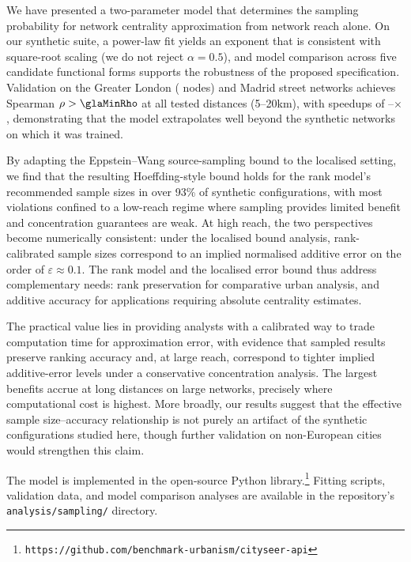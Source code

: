 
We have presented a two-parameter model that determines the sampling probability for network centrality approximation from network reach alone. On our synthetic suite, a power-law fit yields an exponent that is consistent with square-root scaling (we do not reject $\alpha = 0.5$), and model comparison across five candidate functional forms supports the robustness of the proposed specification. Validation on the Greater London (\glaNnodes{} nodes) and Madrid street networks achieves Spearman $\rho > \glaMinRho$ at all tested distances (5--20km), with speedups of \glaFiveKmSpeedup{}--\glaTwentyKmSpeedup{}$\times$, demonstrating that the model extrapolates well beyond the synthetic networks on which it was trained.

By adapting the Eppstein--Wang source-sampling bound to the localised setting, we find that the resulting Hoeffding-style bound holds for the rank model's recommended sample sizes in over 93\% of synthetic configurations, with most violations confined to a low-reach regime where sampling provides limited benefit and concentration guarantees are weak. At high reach, the two perspectives become numerically consistent: under the localised bound analysis, rank-calibrated sample sizes correspond to an implied normalised additive error on the order of $\varepsilon \approx 0.1$. The rank model and the localised error bound thus address complementary needs: rank preservation for comparative urban analysis, and additive accuracy for applications requiring absolute centrality estimates.

The practical value lies in providing analysts with a calibrated way to trade computation time for approximation error, with evidence that sampled results preserve ranking accuracy and, at large reach, correspond to tighter implied additive-error levels under a conservative concentration analysis. The largest benefits accrue at long distances on large networks, precisely where computational cost is highest. More broadly, our results suggest that the effective sample size--accuracy relationship is not purely an artifact of the synthetic configurations studied here, though further validation on non-European cities would strengthen this claim.

The model is implemented in the open-source \cityseer{} Python library.\footnote{\texttt{https://github.com/benchmark-urbanism/cityseer-api}} Fitting scripts, validation data, and model comparison analyses are available in the repository's \texttt{analysis/sampling/} directory.
